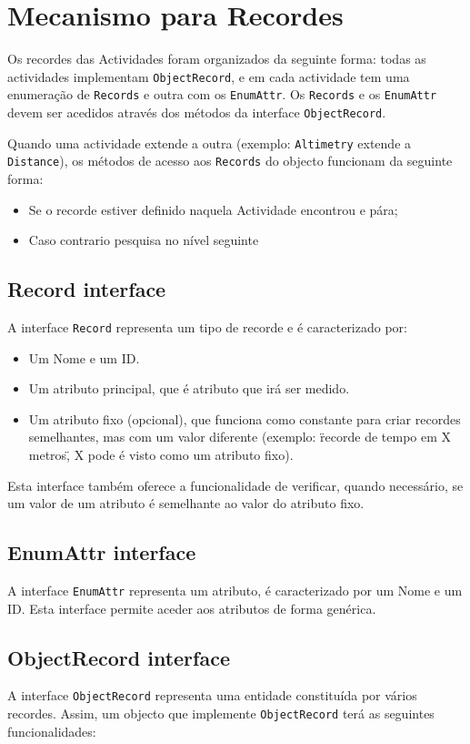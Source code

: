 \documentclass[a4paper,10pt]{report}
\begin{document}
\section{Mecanismo para Recordes}
\label{sec:record}
Os recordes das Actividades foram organizados da seguinte forma: todas as actividades implementam \verb!ObjectRecord!, e em cada actividade 
tem uma enumeração de \verb!Records! e outra com os \verb!EnumAttr!.
Os \verb!Records! e os \verb!EnumAttr! devem ser acedidos através dos métodos da interface \verb!ObjectRecord!.

Quando uma actividade extende a outra (exemplo: \verb!Altimetry! extende a \verb!Distance!), 
os métodos de acesso aos \verb!Records! do objecto funcionam da seguinte forma:
\begin{itemize}
 \item Se o recorde estiver definido naquela Actividade encontrou e pára;
 \item Caso contrario pesquisa no nível seguinte
\end{itemize}

\subsection{Record interface}
\label{subsec:record}
A interface \verb!Record! representa um tipo de recorde e é caracterizado por:
\begin{itemize}
 \item Um Nome e um ID. 
 \item Um atributo principal, que é atributo que irá ser medido.
 \item Um atributo fixo (opcional), que funciona como constante para criar recordes semelhantes, mas com um valor diferente 
	(exemplo: \"recorde de tempo em X metros\", X pode é visto como um atributo fixo).
\end{itemize}

Esta interface também oferece a funcionalidade de verificar, quando necessário, se um valor de um atributo é semelhante ao valor do atributo fixo.

\subsection{EnumAttr interface}
\label{subsec:enumAttr}
A interface \verb!EnumAttr! representa um atributo, é caracterizado por um Nome e um ID. 
Esta interface permite aceder aos atributos de forma genérica.

\subsection{ObjectRecord interface}
\label{subsec:objectRecord}
A interface \verb!ObjectRecord! representa uma entidade constituída por vários recordes. 
Assim, um objecto que implemente \verb!ObjectRecord! terá as seguintes funcionalidades:
\end{document}
